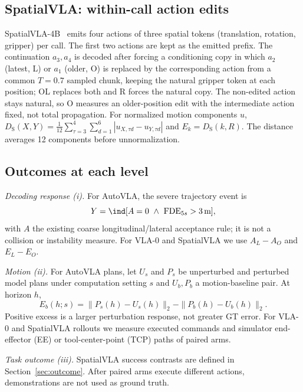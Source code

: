 \subsection{SpatialVLA: within-call action edits}
SpatialVLA-4B~\cite{qu2025spatialvla} emits four actions of three spatial tokens (translation, rotation, gripper) per call. The first two actions are kept as the emitted prefix. The continuation $a_3,a_4$ is decoded after forcing a conditioning copy in which $a_2$ (latest, L) or $a_1$ (older, O) is replaced by the corresponding action from a common $T{=}0.7$ sampled chunk, keeping the natural gripper token at each position; OL replaces both and R forces the natural copy. The non-edited action stays natural, so O measures an older-position edit with the intermediate action fixed, not total propagation. For normalized motion components $u$, $D_{\mathrm S}(X,Y)=\frac{1}{12}\sum_{\tau=3}^{4}\sum_{d=1}^{6}|u_{X,\tau d}-u_{Y,\tau d}|$ and $E_k=D_{\mathrm S}(k,R)$. The distance averages 12 components before unnormalization.

\subsection{Outcomes at each level}
\emph{Decoding response (i).} For AutoVLA, the severe trajectory event is
\begin{equation}
Y=\ind[A=0\ \land\ \mathrm{FDE}_{5s}>3\,\mathrm m],
\end{equation}
with $A$ the existing coarse longitudinal/lateral acceptance rule; it is not a collision or instability measure. For VLA-0 and SpatialVLA we use $A_L-A_O$ and $E_L-E_O$.

\emph{Motion (ii).} For AutoVLA plans, let $U_s$ and $P_s$ be unperturbed and perturbed model plans under computation setting $s$ and $U_b,P_b$ a motion-baseline pair. At horizon $h$,
\begin{equation}
E_b(h;s)=\|P_s(h)-U_s(h)\|_2-\|P_b(h)-U_b(h)\|_2 .
\end{equation}
Positive excess is a larger perturbation response, not greater GT error. For VLA-0 and SpatialVLA rollouts we measure executed commands and simulator end-effector (EE) or tool-center-point (TCP) paths of paired arms.

\emph{Task outcome (iii).} SpatialVLA success contrasts are defined in Section~\ref{sec:outcome}. After paired arms execute different actions, demonstrations are not used as ground truth.

